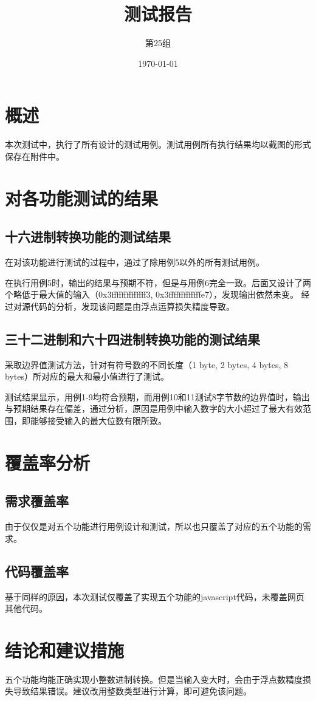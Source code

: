 \documentclass[12pt, a4paper, oneside]{ctexart}
\title{\textbf{测试报告}}
\author{第25组}
\date{\today}
\begin{document}
\maketitle

\section{概述}
本次测试中，执行了所有设计的测试用例。测试用例所有执行结果均以截图的形式保存在附件中。

\section{对各功能测试的结果} %

\subsection{十六进制转换功能的测试结果}
在对该功能进行测试的过程中，通过了除用例5以外的所有测试用例。

在执行用例5时，输出的结果与预期不符，但是与用例6完全一致。后面又设计了两个略低于最大值的输入（0x3ffffffffffffff3, 0x3fffffffffffffe7），发现输出依然未变。
经过对源代码的分析，发现该问题是由浮点运算损失精度导致。
\subsection{三十二进制和六十四进制转换功能的测试结果}
采取边界值测试方法，针对有符号数的不同长度（1 byte, 2 bytes, 4 bytes, 8 bytes）所对应的最大和最小值进行了测试。

测试结果显示，用例1-9均符合预期，而用例10和11测试8字节数的边界值时，输出与预期结果存在偏差，通过分析，原因是用例中输入数字的大小超过了最大有效范围，即能够接受输入的最大位数有限所致。

\section{覆盖率分析}
\subsection{需求覆盖率}
由于仅仅是对五个功能进行用例设计和测试，所以也只覆盖了对应的五个功能的需求。

\subsection{代码覆盖率}
基于同样的原因，本次测试仅覆盖了实现五个功能的javascript代码，未覆盖网页其他代码。

\section{结论和建议措施}
五个功能均能正确实现小整数进制转换。但是当输入变大时，会由于浮点数精度损失导致结果错误。建议改用整数类型进行计算，即可避免该问题。
\end{document}
